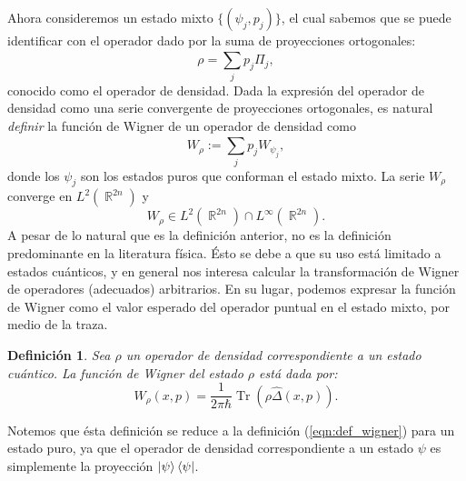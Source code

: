 \documentclass[a4paper,11pt]{report}
\DeclareMathOperator{\R}{\mathbb{R}}
\DeclareMathOperator{\Tr}{Tr}
\newtheorem{definition}{Definición}
\begin{document}
  Ahora consideremos un estado mixto $\{(\psi_j,p_j)\}$, el
  cual sabemos que se puede identificar con el operador dado
  por la suma de proyecciones ortogonales:
  \begin{equation}
    \rho = \sum_{j}^{} p_j \Pi_j,
  \end{equation} 
  conocido como el operador de densidad. Dada la expresión
  del operador de densidad como una serie convergente de
  proyecciones ortogonales, es natural \textit{definir} la
  función de Wigner de un operador de densidad como
  \begin{equation}
    W_\rho 
    := \sum_{j}^{} p_j W_{\psi_j},
  \end{equation} 
  donde los $\psi_j$ son los estados puros que conforman el
  estado mixto. La serie $W_\rho$ converge en $L^2(\R^{2n})$
  y 
  \begin{equation}
    W_\rho \in L^2(\R^{2n}) \cap L^{\infty}(\R^{2n}).
  \end{equation}
  A pesar de lo natural que es la definición anterior, no es
  la definición predominante en la literatura física. Ésto
  se debe a que su uso está limitado a estados cuánticos, y
  en general nos interesa calcular la transformación de
  Wigner de operadores (adecuados) arbitrarios. En su lugar,
  podemos expresar la función de Wigner como el valor
  esperado del operador puntual en el estado mixto, por
  medio de la traza.
  \begin{definition}
    Sea $\rho$ un operador de densidad correspondiente a un
    estado cuántico. La función de Wigner del estado $\rho$ 
    está dada por:
    \begin{equation}
      W_\rho(x,p)
      = \frac{1}{2\pi\hbar} \Tr\left( \rho \hat \Delta(x,p)
      \right).
    \end{equation}
  \end{definition}
  Notemos que ésta definición se reduce a la definición
  (\ref{eqn:def_wigner}) para un estado puro, ya que el
  operador de densidad correspondiente a un estado $\psi$ es
  simplemente la proyección $\ket \psi \bra \psi$.
\end{document}
